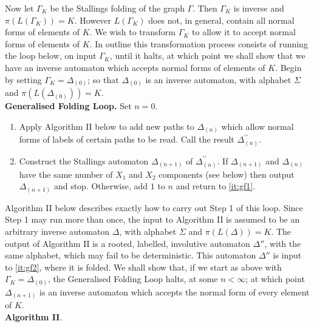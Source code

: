 \documentclass[a4paper,12pt]{article}
\newcommand{\G}{\Gamma }
\newcommand{\D}{\Delta }
\renewcommand{\S}{\Sigma }
\numberwithin{equation}{section}
\numberwithin{figure}{section}
\newcommand{\be}{\begin{enumerate}}
\newcommand{\ee}{\end{enumerate}}
\begin{document}
Now let $\G_K$ be the Stallings folding of the graph $\G$.  Then
 $\G_K$ is inverse and $\pi(L(\G_K))=K$. However
$L(\G_K)$ does not, in general, contain all normal forms of elements of $K$.
We wish to transform $\G_K$ to allow it to accept normal forms of
elements of $K$. In outline this transformation process consists of
running the loop below, on input $\G_K$,
until it halts, at which point we shall show that we have an
inverse automaton which accepts  normal forms of elements of $K$.
Begin by setting $\G_K=\D_{(0)}$; so  that $\D_{(0)}$ is an inverse automaton, with alphabet $\S$
and $\pi(L(\D_{(0)}))=K$. \\[1em]
\textbf{Generalised Folding Loop.}
Set $n=0$.
\be[Step 1]
\item\label{it:gf1} Apply Algorithm II below to add new paths to $\D_{(n)}$ which allow normal forms of labels
of certain paths to be read. %
Call the result $\D_{(n)}^{\prime\prime}$.
\item\label{it:gf2} Construct the Stallings automaton $\D_{(n+1)}$
of $\D_{(n)}^{\prime\prime}$. If $\D_{(n+1)}$ and
$\D_{(n)}$ have the same
 number of
$X_1$ and $X_2$ components (see below) then output $\D_{(n+1)}$
and stop. Otherwise, add $1$ to $n$ and  return to   \ref{it:gf1}.
\ee

Algorithm II below describes exactly how to carry out Step 1 of
this loop. Since Step 1 may run more than once,  the input to 
Algorithm II is assumed to be an arbitrary inverse automaton $\D$,
with alphabet $\S$ and $\pi(L(\D))=K$. The output of Algorithm II
is a rooted,
labelled, involutive automaton $\D''$, with the same alphabet, which may
fail to be deterministic. This automaton $\D''$ is input to \ref{it:gf2}, 
where it is folded. We shall show that, if we start as above
with $\G_K=\D_{(0)}$,  the Generalised Folding Loop halts, at some $n<\infty$; at
which point $\D_{(n+1)}$ is an inverse automaton which accepts the
normal form of every element of $K$. \\[1em]

\noindent\textbf{Algorithm II}. \\
\end{document}

